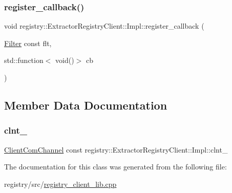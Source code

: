 \mbox{\label{classregistry_1_1ExtractorRegistryClient_1_1Impl_aa85c7398b9da00a5eb35b9373b4a755d}} 
\subsubsection{\texorpdfstring{register\+\_\+callback()}{register\_callback()}}
{\footnotesize\ttfamily void registry\+::\+Extractor\+Registry\+Client\+::\+Impl\+::register\+\_\+callback (\begin{DoxyParamCaption}\item[{\hyperlink{classregistry_1_1Filter}{Filter} const}]{flt,  }\item[{std\+::function$<$ void()$>$}]{cb }\end{DoxyParamCaption})}



\subsection{Member Data Documentation}
\mbox{\label{classregistry_1_1ExtractorRegistryClient_1_1Impl_a702a01fb0fd983dbe146eb358736abd0}} 
\subsubsection{\texorpdfstring{clnt\+\_\+}{clnt\_}}
{\footnotesize\ttfamily \hyperlink{classregistry_1_1ClientComChannel}{Client\+Com\+Channel} const registry\+::\+Extractor\+Registry\+Client\+::\+Impl\+::clnt\+\_\+\hspace{0.3cm}{\ttfamily [private]}}



The documentation for this class was generated from the following file\+:\begin{DoxyCompactItemize}
\item 
registry/src/\hyperlink{registry__client__lib_8cpp}{registry\+\_\+client\+\_\+lib.\+cpp}\end{DoxyCompactItemize}
